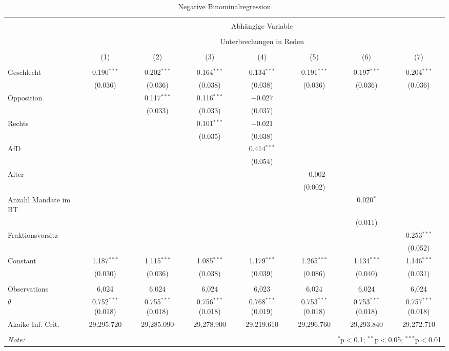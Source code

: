 
\begin{table}[!htbp] \centering 
  \caption{Negative Binominalregression} 
  \label{} 
\begin{tabular}{@{\extracolsep{5pt}}lccccccc} 
\\[-1.8ex]\hline 
\hline \\[-1.8ex] 
 & \multicolumn{7}{c}{Abhängige Variable} \\ 
\cline{2-8} 
\\[-1.8ex] & \multicolumn{7}{c}{Unterbrechungen in Reden} \\ 
\\[-1.8ex] & (1) & (2) & (3) & (4) & (5) & (6) & (7)\\ 
\hline \\[-1.8ex] 
 Geschlecht & 0.190$^{***}$ & 0.202$^{***}$ & 0.164$^{***}$ & 0.134$^{***}$ & 0.191$^{***}$ & 0.197$^{***}$ & 0.204$^{***}$ \\ 
  & (0.036) & (0.036) & (0.038) & (0.038) & (0.036) & (0.036) & (0.036) \\ 
  Opposition &  & 0.117$^{***}$ & 0.116$^{***}$ & $-$0.027 &  &  &  \\ 
  &  & (0.033) & (0.033) & (0.037) &  &  &  \\ 
  Rechts &  &  & 0.101$^{***}$ & $-$0.021 &  &  &  \\ 
  &  &  & (0.035) & (0.038) &  &  &  \\ 
  AfD &  &  &  & 0.414$^{***}$ &  &  &  \\ 
  &  &  &  & (0.054) &  &  &  \\ 
  Alter &  &  &  &  & $-$0.002 &  &  \\ 
  &  &  &  &  & (0.002) &  &  \\ 
  Anzahl Mandate im BT &  &  &  &  &  & 0.020$^{*}$ &  \\ 
  &  &  &  &  &  & (0.011) &  \\ 
  Fraktionsvorsitz &  &  &  &  &  &  & 0.253$^{***}$ \\ 
  &  &  &  &  &  &  & (0.052) \\ 
  Constant & 1.187$^{***}$ & 1.115$^{***}$ & 1.085$^{***}$ & 1.179$^{***}$ & 1.265$^{***}$ & 1.134$^{***}$ & 1.146$^{***}$ \\ 
  & (0.030) & (0.036) & (0.038) & (0.039) & (0.086) & (0.040) & (0.031) \\ 
 \hline \\[-1.8ex] 
Observations & 6,024 & 6,024 & 6,024 & 6,023 & 6,024 & 6,024 & 6,024 \\ 
$\theta$ & 0.752$^{***}$  (0.018) & 0.755$^{***}$  (0.018) & 0.756$^{***}$  (0.018) & 0.768$^{***}$  (0.019) & 0.753$^{***}$  (0.018) & 0.753$^{***}$  (0.018) & 0.757$^{***}$  (0.018) \\ 
Akaike Inf. Crit. & 29,295.720 & 29,285.090 & 29,278.900 & 29,219.610 & 29,296.760 & 29,293.840 & 29,272.710 \\ 
\hline 
\hline \\[-1.8ex] 
\textit{Note:}  & \multicolumn{7}{r}{$^{*}$p$<$0.1; $^{**}$p$<$0.05; $^{***}$p$<$0.01} \\ 
\end{tabular} 
\end{table} 
